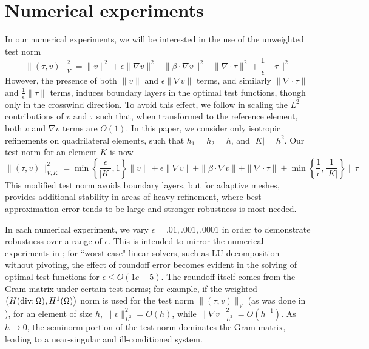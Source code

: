 \documentclass[11pt,onecolumn]{scrartcl}
\newcommand{\grad}{\nabla}
\renewcommand{\div}{\grad \cdot}
\begin{document}
\section{Numerical experiments}

In our numerical experiments, we will be interested in the use of the unweighted test norm 
\[
\|\left(\tau, v\right)\|_{V}^2 = \|v\|^2 + \epsilon \|\grad v\|^2 + \|\beta \cdot \grad v\|^2 + \| \div \tau\|^2 + \frac{1}{\epsilon}\|\tau\|^2
\]
However, the presence of both $\|v\|$ and $\epsilon\|\grad v\|$ terms, and similarly $\|\div \tau\|$ and $\frac{1}{\epsilon}\|\tau\|$ terms, induces boundary layers in the optimal test functions, though only in the crosswind direction.  To avoid this effect, we follow \cite{DPGrobustness} in scaling the $L^2$ contributions of $v$ and $\tau$ such that, when transformed to the reference element, both $v$ and $\grad v$ terms are $O(1)$.  In this paper, we consider only isotropic refinements on quadrilateral elements, such that $h_1 = h_2 = h$, and $|K| = h^2$. Our test norm for an element $K$ is now
\[
\|\left(\tau, v\right)\|_{V,K}^2 = \min\left\{\frac{\epsilon}{|K|},1\right\}\|v\| + \epsilon \|\grad v\| + \|\beta \cdot \grad v\| + \| \div \tau\| + \min\left\{\frac{1}{\epsilon},\frac{1}{|K|}\right\}\|\tau\|
\]
This modified test norm avoids boundary layers, but for adaptive meshes, provides additional stability in areas of heavy refinement, where best approximation error tends to be large and stronger robustness is most needed.  %


In each numerical experiment, we vary $\epsilon = .01, .001, .0001$ in order to demonstrate robustness over a range of $\epsilon$.  This is intended to mirror the numerical experiments in \cite{DPGrobustness}; for ``worst-case" linear solvers, such as LU decomposition without pivoting, the effect of roundoff error becomes evident in the solving of optimal test functions for $\epsilon \leq O(1e-5)$.  The roundoff itself comes from the Gram matrix under certain test norms; for example, if the weighted $\left(H({\rm div};\Omega), H^1(\Omega)\right)$ norm is used for the test norm $\|\left(\tau,v\right)\|_V$ (as was done in \cite{DPG2}), for an element of size $h$, $\|v\|_{L^2}^2 = O(h)$, while $\|\grad v\|_{L^2}^2 = O(h^{-1})$. As $h\rightarrow 0$, the seminorm portion of the test norm dominates the Gram matrix, leading to a near-singular and ill-conditioned system. 
\end{document}
